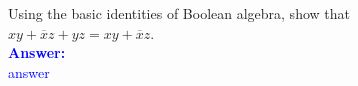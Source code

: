 \item{}
Using the basic identities of Boolean algebra, show that\\[6pt]
$xy+\overline{x}z+yz=xy+\overline{x}z$.\\[12pt]
\ifanswers
\textcolor{blue}{
\textbf{Answer:}\\
answer
}
\newpage
\fi

